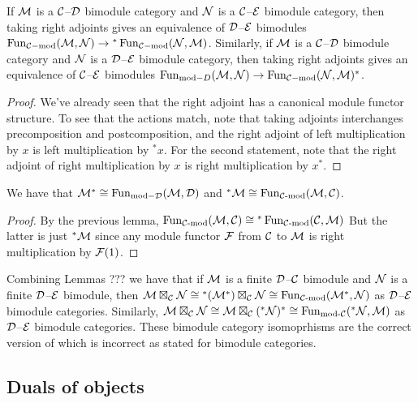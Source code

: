 \documentclass{amsart}
\begin{document}
\begin{lemma}
If $\mathcal M$ is a $\mathcal C$--$\mathcal D$ bimodule category and $\mathcal N$ is a $\mathcal C$--$\mathcal E$ bimodule category, then taking right adjoints gives an equivalence of $\mathcal D$--$\mathcal E$ bimodules $\operatorname{Fun}_{\mathcal C-\text{mod}}(\mathcal M, \mathcal N) \rightarrow {}^*\operatorname{Fun}_{\mathcal C-\text{mod}}(\mathcal N, \mathcal M)$.  Similarly, if $\mathcal M$ is a $\mathcal C$--$\mathcal D$ bimodule category and $\mathcal N$ is a $\mathcal D$--$\mathcal E$ bimodule category, then taking right adjoints gives an equivalence of $\mathcal C$--$\mathcal E$ bimodules $\operatorname{Fun}_{\text{mod}-D}(\mathcal M, \mathcal N) \rightarrow \operatorname{Fun}_{\mathcal C-\text{mod}}(\mathcal N, \mathcal M)^*$. 
\end{lemma}
\begin{proof}
We've already seen that the right adjoint has a canonical module functor structure.  To see that the actions match, note that taking adjoints interchanges precomposition and postcomposition, and the right adjoint of left multiplication by $x$ is left multiplication by ${}^*x$.  For the second statement, note that the right adjoint of right multiplication by $x$ is right multiplication by $x^*$.
\end{proof}

\begin{lemma}
We have that $\mathcal M^* \cong \operatorname{Fun}_{\text{mod}-\mathcal D}(\mathcal M, \mathcal D)$ and ${}^*\mathcal M \cong \operatorname{Fun}_{\mathcal C\text{-mod}}(\mathcal M, \mathcal C)$.
\end{lemma}
\begin{proof}
By the previous lemma, $\operatorname{Fun}_{\mathcal C\text{-mod}}(\mathcal M, \mathcal C) \cong {}^*\operatorname{Fun}_{\mathcal C\text{-mod}}(\mathcal C, \mathcal M)$  But the latter is just ${}^*\mathcal M$ since any module functor $\mathcal F$ from $\mathcal C$ to $\mathcal M$ is right multiplication by $\mathcal F(1)$.
\end{proof}

\begin{remark}
Combining Lemmas ??? we have that if $\mathcal M$ is a finite $\mathcal D$--$\mathcal C$ bimodule and $\mathcal N$ is a finite $\mathcal D$--$\mathcal E$ bimodule, then $\mathcal M \boxtimes_\mathcal C \mathcal N \cong {}^*(\mathcal M^*) \boxtimes_\mathcal C \mathcal N \cong \operatorname{Fun}_{\mathcal C\text{-mod}}(\mathcal M^*,\mathcal N)$ as $\mathcal D$--$\mathcal E$ bimodule categories.   Similarly, $\mathcal M \boxtimes_\mathcal C \mathcal N \cong \mathcal M \boxtimes_\mathcal C ({}^*\mathcal N)^* \cong \operatorname{Fun}_{\text{mod-}\mathcal C}({}^*\mathcal N,\mathcal M)$ as $\mathcal D$--$\mathcal E$ bimodule categories.  These bimodule category isomoprhisms are the correct version of \cite{???} which is incorrect as stated for bimodule categories.
\end{remark}

\subsection{Duals of objects} \label{sec-df-objects}
\end{document}
